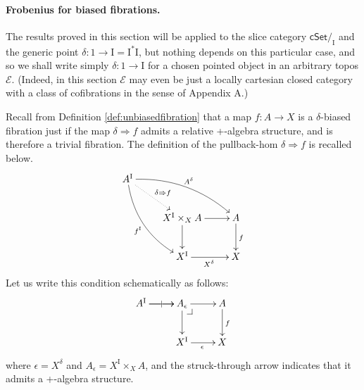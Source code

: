 \documentclass[11pt]{amsart}
\makeatletter
\newcommand{\EE}{\ensuremath{\mathcal{E}}}
\newcommand{\cSet}{\ensuremath{\mathsf{cSet}}}
\newcommand{\ra}{\ensuremath{\rightarrow}}
\renewcommand{\to}{\ensuremath{\rightarrow}}
\newcommand{\pbh}[2]{#1\!\Rightarrow\!#2}
\newcommand{\I}{\ensuremath{\mathrm{I}}}
\theoremstyle{remark}
\theoremstyle{definition}
\newcommand{\pbcorner}[1][dr]{\save*!/#1-1.2pc/#1:(-1,1)@^{|-}\restore}
\makeatother
\begin{document}
\paragraph{Frobenius for biased fibrations.}

The results proved in this section will be applied to the slice category $\cSet/_\I$ and the generic point $\delta : 1 \ra \I = \I^*\I$, but nothing depends on this particular case, and so we shall write simply $\delta : 1\to \I$ for a chosen pointed object in an arbitrary topos $\EE$.  (Indeed, in this section $\EE$ may even be just a locally cartesian closed category with a class of cofibrations in the sense of Appendix A.)

Recall from Definition \ref{def:unbiasedfibration} that a map $f:A\ra X$  is a $\delta$-biased fibration just if the map $\delta \Rightarrow f$ admits a relative +-algebra structure, and is therefore a trivial fibration.  The definition of the pullback-hom $\pbh{\delta}{f}$ is recalled below.
\begin{equation}\label{diagram:frobenius1}
\xymatrix{
A^\I \ar@/_3ex/ [rdd]_{f^\I} \ar@{.>}[rd]^{\delta\Rightarrow{f}} \ar@/^3ex/ [rrd]^{A^{\delta}}  && \\
& X^\I \times_{X} A \ar[d] \ar[r] & A \ar[d]^{f} \\
& X^\I \ar[r]_{X^{\delta}} &  X
}
\end{equation}
Let us write this condition schematically as follows:
\begin{equation}\label{diagram:frobenius1}
\xymatrix{
A^\I \ar[r]|| \ar[r]  & A_\epsilon\ar[d] \pbcorner \ar[r] & A \ar[d]^f \\
& X^\I \ar[r]_{\epsilon} &  X
}
\end{equation}
where $\epsilon = X^{\delta}$ and $A_\epsilon = X^\I \times_{X} A$, and the struck-through arrow indicates that it admits a +-algebra structure.
\end{document}
